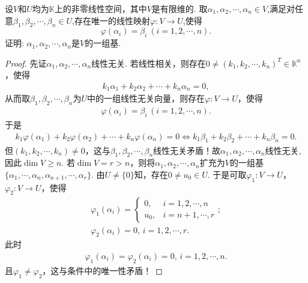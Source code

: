 \documentclass[../../main.tex]{subfiles}%
\begin{document}
\begin{example}
设$V$和$U$均为$\mathbb{K}$上的非零线性空间，其中$V$是有限维的. 取$\alpha_1,\alpha_2,\cdots,\alpha_n \in V$,满足对任意$\beta_1,\beta_2,\cdots,\beta_n \in U$,存在唯一的线性映射$\varphi:V \to U$,使得
$$\varphi(\alpha_i)=\beta_i\ (i=1,2,\cdots,n).$$
证明: $\alpha_1,\alpha_2,\cdots,\alpha_n$是$V$的一组基.
\end{example}
\begin{proof}

先证$\alpha_1,\alpha_2,\cdots,\alpha_n$线性无关. 若线性相关，则存在$0 \ne (k_1,k_2,\cdots,k_n)^T \in \mathbb{K}^n$，使得
\begin{align*}
k_1\alpha_1 + k_2\alpha_2 + \cdots + k_n\alpha_n = 0,
\end{align*}
从而取$\beta_1,\beta_2,\cdots,\beta_n$为$U$中的一组线性无关向量，则存在$\varphi:V \rightarrow U$，使得
\begin{align*}
\varphi(\alpha_i) = \beta_i \, (i=1,2,\cdots,n).
\end{align*}
于是
\begin{align*}
k_1\varphi(\alpha_1) + k_2\varphi(\alpha_2) + \cdots + k_n\varphi(\alpha_n) = 0 \Longleftrightarrow k_1\beta_1 + k_2\beta_2 + \cdots + k_n\beta_n = 0.
\end{align*}
但$(k_1,k_2,\cdots,k_n) \ne 0$，这与$\beta_1,\beta_2,\cdots,\beta_n$线性无关矛盾！故$\alpha_1,\alpha_2,\cdots,\alpha_n$线性无关,
因此$\dim V \geqslant n$. 若$\dim V = r > n$，则将$\alpha_1,\alpha_2,\cdots,\alpha_n$扩充为$V$的一组基$\{\alpha_1,\cdots,\alpha_n,\alpha_{n+1},\cdots,\alpha_r\}$.
由$U \ne \{0\}$知，存在$0 \ne u_0 \in U$. 于是可取$\varphi_1:V \rightarrow U$，$\varphi_2:V \rightarrow U$，使得
\begin{gather*}
\varphi_1(\alpha_i) = \begin{cases} 
0, & i=1,2,\cdots,n \\
u_0, & i=n+1,\cdots,r 
\end{cases};
\\
\varphi_2(\alpha_i) = 0, \, i=1,2,\cdots,r.
\end{gather*}
此时
\begin{align*}
\varphi_1(\alpha_i) = \varphi_2(\alpha_i) = 0, \, i=1,2,\cdots,n.
\end{align*}
且$\varphi_1 \ne \varphi_2$，这与条件中的唯一性矛盾！

\end{proof}
\end{document}
